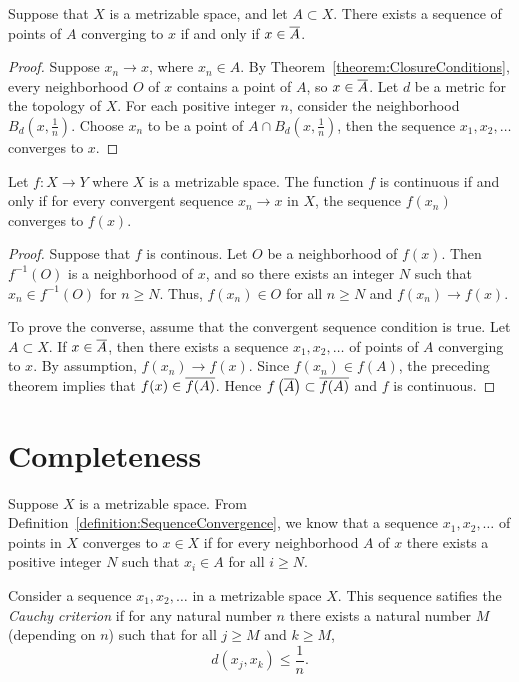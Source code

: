 \begin{theorem}
Suppose that $X$ is a metrizable space, and let $A \subset X$.
There exists a sequence of points of $A$ converging to $x$ if and only if $x \in \overline{A}$.
\end{theorem}
\begin{proof}
Suppose $x_n \rightarrow x$, where $x_n \in A$.
By Theorem~\ref{theorem:ClosureConditions}, every neighborhood $O$ of $x$ contains a point of $A$, so $x \in \overline{A}$.
Let $d$ be a metric for the topology of $X$.
For each positive integer $n$, consider the neighborhood $B_d \left( x, \frac{1}{n} \right)$.
Choose $x_n$ to be a point of $A \cap B_d \left( x, \frac{1}{n} \right)$,
then the sequence $x_1, x_2, \ldots$ converges to $x$.
\end{proof}

\begin{theorem}
Let $f: X \rightarrow Y$ where $X$ is a metrizable space.
The function $f$ is continuous if and only if for every convergent sequence $x_n \rightarrow x$ in $X$, the sequence $f(x_n)$ converges to $f(x)$.
\end{theorem}
\begin{proof}
Suppose that $f$ is continous.
Let $O$ be a neighborhood of $f(x)$.
Then $f^{-1}(O)$ is a neighborhood of $x$, and so there exists an integer $N$ such that $x_n \in f^{-1}(O)$ for $n \geq N$.
Thus, $f(x_n) \in O$ for all $n \geq N$ and $f(x_n) \rightarrow f(x)$.

To prove the converse, assume that the convergent sequence condition is true.
Let $A \subset X$.
If $x \in \overline{A}$, then there exists a sequence $x_1, x_2, \ldots$ of points of $A$ converging to $x$.
By assumption, $f(x_n) \rightarrow f(x)$.
Since $f(x_n) \in f(A)$, the preceding theorem implies that $f(x) \in \overline{f(A)}$.
Hence $f \left( \overline{A} \right) \subset \overline{f(A)}$ and $f$ is continuous.
\end{proof}


\section{Completeness}

Suppose $X$ is a metrizable space.
From Definition~\ref{definition:SequenceConvergence}, we know that a sequence $x_1, x_2, \ldots$ of points in $X$ converges to $x \in X$ if for every neighborhood $A$ of $x$ there exists a positive integer $N$ such that $x_i \in A$ for all $i \geq N$.

\begin{definition}
Consider a sequence $x_1, x_2, \ldots$ in a metrizable space $X$.
This sequence satifies the \emph{Cauchy criterion} if for any natural number $n$ there exists a natural number $M$ (depending on $n$) such that for all $j \geq M$ and $k \geq M$,
\begin{equation*}
d \left( x_j, x_k \right) \leq \frac{1}{n}.
\end{equation*}
\end{definition}

